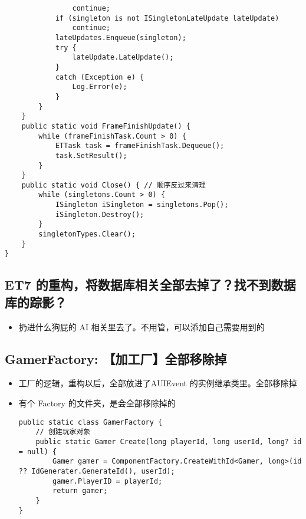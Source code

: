 \documentclass[9pt, b5paper]{article}
\begin{document}
\begin{verbatim}
                continue;
            if (singleton is not ISingletonLateUpdate lateUpdate) 
                continue;
            lateUpdates.Enqueue(singleton);
            try {
                lateUpdate.LateUpdate();
            }
            catch (Exception e) {
                Log.Error(e);
            }
        }
    }
    public static void FrameFinishUpdate() {
        while (frameFinishTask.Count > 0) {
            ETTask task = frameFinishTask.Dequeue();
            task.SetResult();
        }
    }
    public static void Close() { // 顺序反过来清理
        while (singletons.Count > 0) {
            ISingleton iSingleton = singletons.Pop();
            iSingleton.Destroy();
        }
        singletonTypes.Clear();
    }
}
\end{verbatim}
\subsection{ET7 的重构，将数据库相关全部去掉了？找不到数据库的踪影？}
\label{sec-8-3}
\begin{itemize}
\item 扔进什么狗屁的 AI 相关里去了。不用管，可以添加自己需要用到的
\end{itemize}
\subsection{GamerFactory: 【加工厂】全部移除掉}
\label{sec-8-4}
\begin{itemize}
\item 工厂的逻辑，重构以后，全部放进了AUIEvent 的实例继承类里。全部移除掉
\item 有个 Factory 的文件夹，是会全部移除掉的
\begin{verbatim}
public static class GamerFactory {
    // 创建玩家对象
    public static Gamer Create(long playerId, long userId, long? id = null) {
        Gamer gamer = ComponentFactory.CreateWithId<Gamer, long>(id ?? IdGenerater.GenerateId(), userId);
        gamer.PlayerID = playerId;
        return gamer;
    }
}
\end{verbatim}
\end{itemize}
\end{document}
